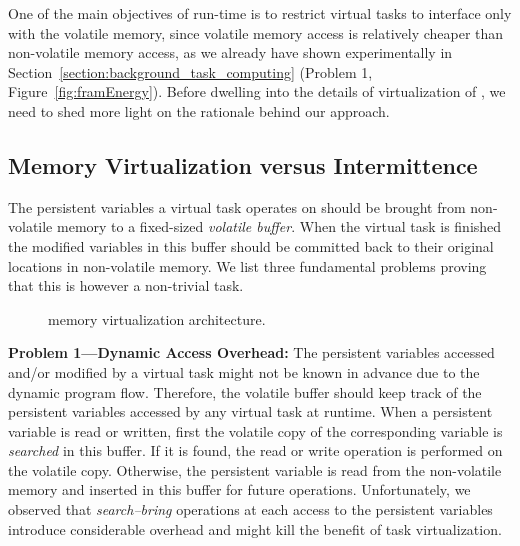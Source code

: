 One of the main objectives of \sys run-time is to restrict virtual tasks to interface only with the volatile memory, since volatile memory access is relatively cheaper than non-volatile memory access, as we already have shown experimentally in Section~\ref{section:background_task_computing} (Problem 1, Figure~\ref{fig:framEnergy}). Before dwelling into the details of virtualization of \sys, we need to shed more light on the rationale behind our approach.

\subsection{Memory Virtualization versus Intermittence}
\label{sec:virtualization_problems}

The persistent variables a virtual task operates on should be brought from non-volatile memory to a fixed-sized \emph{volatile buffer}. When the virtual task is finished the modified variables in this buffer should be committed back to their original locations in non-volatile memory. We list three fundamental problems proving that this is however a non-trivial task. 

\begin{figure}
	\centering
	\caption{\sys memory virtualization architecture.}
	\label{fig:virtualization_architecture}
\end{figure}


\textbf{Problem 1---Dynamic Access Overhead:} The persistent variables accessed and/or modified by a virtual task might not be known in advance due to the dynamic program flow. Therefore, the volatile buffer should keep track of the persistent variables accessed by any virtual task at runtime. When a persistent variable is read or written, first the volatile copy of the corresponding variable is \emph{searched} in this buffer. If it is found, the read or write operation is performed on the volatile copy. Otherwise, the persistent variable is read from the non-volatile memory and inserted in this buffer for future operations. Unfortunately, we observed that \emph{search--bring} operations at each access to the persistent variables introduce considerable overhead and might kill the benefit of task virtualization. %

